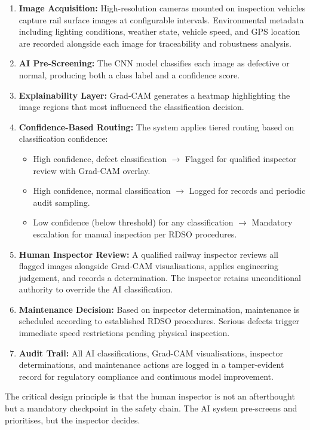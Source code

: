 \documentclass[conference]{IEEE}
\begin{document}
\begin{enumerate}
    \item \textbf{Image Acquisition:} High-resolution cameras mounted on inspection vehicles capture rail surface images at configurable intervals. Environmental metadata including lighting conditions, weather state, vehicle speed, and GPS location are recorded alongside each image for traceability and robustness analysis.
    \item \textbf{AI Pre-Screening:} The CNN model classifies each image as defective or normal, producing both a class label and a confidence score.
    \item \textbf{Explainability Layer:} Grad-CAM generates a heatmap highlighting the image regions that most influenced the classification decision.
    \item \textbf{Confidence-Based Routing:} The system applies tiered routing based on classification confidence:
    \begin{itemize}
        \item High confidence, defect classification $\rightarrow$ Flagged for qualified inspector review with Grad-CAM overlay.
        \item High confidence, normal classification $\rightarrow$ Logged for records and periodic audit sampling.
        \item Low confidence (below threshold) for any classification $\rightarrow$ Mandatory escalation for manual inspection per RDSO procedures.
    \end{itemize}
    \item \textbf{Human Inspector Review:} A qualified railway inspector reviews all flagged images alongside Grad-CAM visualisations, applies engineering judgement, and records a determination. The inspector retains unconditional authority to override the AI classification.
    \item \textbf{Maintenance Decision:} Based on inspector determination, maintenance is scheduled according to established RDSO procedures. Serious defects trigger immediate speed restrictions pending physical inspection.
    \item \textbf{Audit Trail:} All AI classifications, Grad-CAM visualisations, inspector determinations, and maintenance actions are logged in a tamper-evident record for regulatory compliance and continuous model improvement.
\end{enumerate}

The critical design principle is that the human inspector is not an afterthought but a mandatory checkpoint in the safety chain. The AI system pre-screens and prioritises, but the inspector decides.
\end{document}
